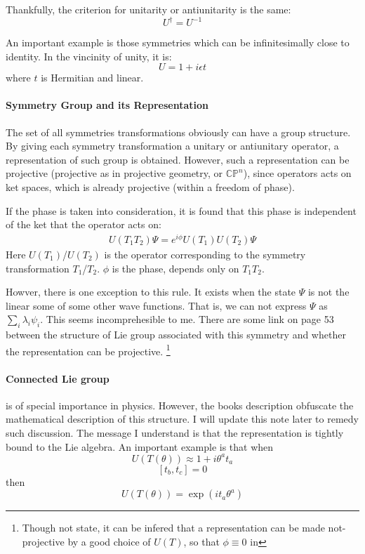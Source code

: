 \documentclass{article}
\numberwithin{equation}{subsection} %
\theoremstyle{definition}
\begin{document}
    Thankfully, the criterion for unitarity or antiunitarity is the same:
    $$U^\dagger = U^{-1}$$
    
    An important example is those symmetries which can be infinitesimally
    close to identity. In the vincinity of unity, it is:
    $$ U =1+i\epsilon t $$
    where $t$ is Hermitian and linear.

    \paragraph{Symmetry Group and its Representation} The set of all
    symmetries transformations obviously can have a group structure.
    By giving each symmetry transformation a unitary or antiunitary
    operator, a representation of such group is obtained. However,
    such a representation can be projective (projective as in
    projective geometry, or $\mathbb{CP}^n$), since operators acts
    on ket spaces, which is already projective (within a freedom of
    phase). 

    If the phase is taken into consideration, it is found that this
    phase is independent of the ket that the operator acts on:
    \begin{align}
        \label{eq:2.2_symmetries_projective_phase}
        U(T_1 T_2) \Psi = e^{i\phi} U(T_1) U(T_2) \Psi
    \end{align}
    Here $U(T_1)$/$U(T_2)$ is the operator corresponding to the symmetry
    transformation $T_1$/$T_2$. $\phi$ is the phase, depends only
    on $T_1 T_2$.

    Howver, there is one exception to this rule. It exists when the
    state $\Psi$ is not the linear some of some other wave functions.
    That is, we can not express $\Psi$ as $\sum_i \lambda_i \psi_i$.
    This seems incomprehesible to me.
    There are some link on page 53
    between the structure of Lie group associated
    with this symmetry and whether the representation can be projective.
    \footnote{Though not state, it can be infered that a representation
    can be made not-projective by a good choice of $U(T)$, so that
    $\phi \equiv 0$ in  }

    \paragraph{Connected Lie group} is of special importance in physics.
    However, the books description obfuscate the mathematical description
    of this structure. I will update this note later to remedy such
    discussion. The message I understand is that the representation is
    tightly bound to the Lie algebra. An important example is that when
    $$ U(T(\theta)) \approx 1 + i \theta^a t_a $$
    $$ [t_b,t_c] = 0$$
    then
    $$ U(T(\theta)) = \exp(it_a \theta^a) $$
\end{document}
